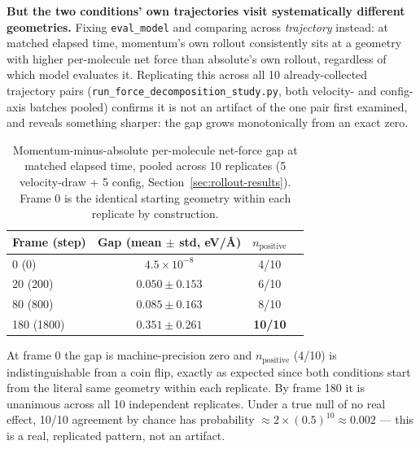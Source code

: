 \documentclass[11pt]{article}
\begin{document}
\textbf{But the two conditions' own trajectories visit systematically
different geometries.} Fixing \texttt{eval\_model} and comparing across
\emph{trajectory} instead: at matched elapsed time, momentum's own rollout
consistently sits at a geometry with higher per-molecule net force than
absolute's own rollout, regardless of which model evaluates it. Replicating
this across all 10 already-collected trajectory pairs
(\texttt{run\_force\_decomposition\_study.py}, both velocity- and
config-axis batches pooled) confirms it is not an artifact of the one pair
first examined, and reveals something sharper: the gap grows monotonically
from an exact zero.

\begin{table}[h]
\centering
\caption{Momentum-minus-absolute per-molecule net-force gap at matched
elapsed time, pooled across 10 replicates (5 velocity-draw + 5 config,
Section~\ref{sec:rollout-results}). Frame 0 is the identical starting
geometry within each replicate by construction.}
\label{tab:force-gap-by-frame}
\begin{tabular}{lccc}
\toprule
Frame (step) & Gap (mean $\pm$ std, eV/\AA) & $n_{\mathrm{positive}}$ \\
\midrule
0 (0)      & $4.5{\times}10^{-8}$        & 4/10 \\
20 (200)   & $0.050 \pm 0.153$           & 6/10 \\
80 (800)   & $0.085 \pm 0.163$           & 8/10 \\
180 (1800) & $0.351 \pm 0.261$           & \textbf{10/10} \\
\bottomrule
\end{tabular}
\end{table}

At frame 0 the gap is machine-precision zero and $n_{\mathrm{positive}}$
(4/10) is indistinguishable from a coin flip, exactly as expected since both
conditions start from the literal same geometry within each replicate. By
frame 180 it is unanimous across all 10 independent replicates. Under a true
null of no real effect, 10/10 agreement by chance has probability
$\approx 2\times(0.5)^{10} \approx 0.002$ --- this is a real, replicated
pattern, not an artifact.
\end{document}
